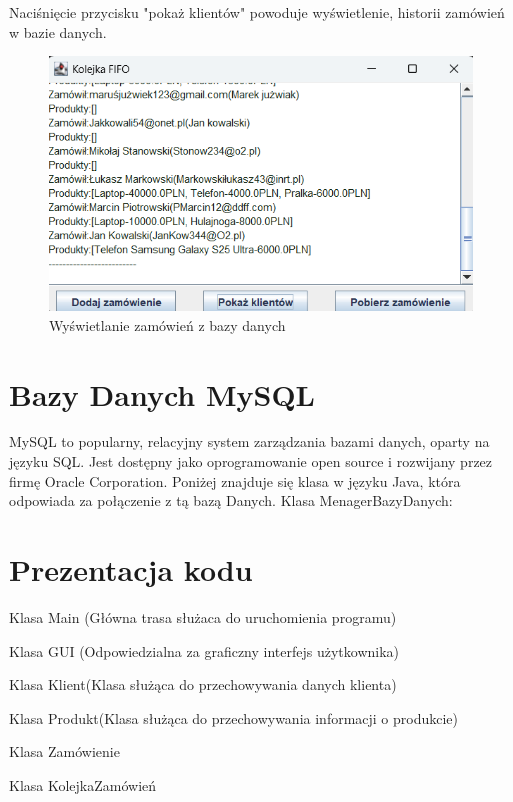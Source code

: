 
Naciśnięcie przycisku "pokaż klientów" powoduje wyświetlenie, historii zamówień w bazie danych.
\begin{figure}[H]
	\centering
	\includegraphics[width=0.7\linewidth]{figures/screenshot010}
	\caption{Wyświetlanie zamówień z bazy danych}
	\label{fig:screenshot010}
\end{figure}


\section{Bazy Danych MySQL}

MySQL to popularny, relacyjny system zarządzania bazami danych, oparty na języku SQL. Jest dostępny jako oprogramowanie open source i rozwijany przez firmę Oracle Corporation. Poniżej znajduje się klasa w języku Java, która odpowiada za połączenie z tą bazą Danych. 
Klasa MenagerBazyDanych:




\section{Prezentacja kodu}

Klasa Main (Główna trasa służaca do uruchomienia programu)

Klasa GUI (Odpowiedzialna za graficzny interfejs użytkownika)

Klasa Klient(Klasa służąca do przechowywania danych klienta)

Klasa Produkt(Klasa służąca do przechowywania informacji o
produkcie)

Klasa Zamówienie

Klasa KolejkaZamówień


